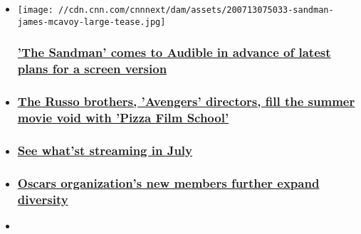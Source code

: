 \begin{itemize}
\item
  \href{/2020/07/15/entertainment/sandman-audible/index.html}{}

  \texttt{[image: //cdn.cnn.com/cnnnext/dam/assets/200713075033-sandman-james-mcavoy-large-tease.jpg]}

  \hypertarget{the-sandman-comes-to-audible-in-advance-of-latest-plans-for-a-screen-version}{%
  \subsubsection{\texorpdfstring{\href{/2020/07/15/entertainment/sandman-audible/index.html}{'The
  Sandman' comes to Audible in advance of latest plans for a screen
  version}}{'The Sandman' comes to Audible in advance of latest plans for a screen version}}\label{the-sandman-comes-to-audible-in-advance-of-latest-plans-for-a-screen-version}}
\item
  \hypertarget{the-russo-brothers-avengers-directors-fill-the-summer-movie-void-with-pizza-film-school}{%
  \subsubsection{\texorpdfstring{\href{/2020/07/09/entertainment/russo-brothers-pizza-film-school/index.html}{The
  Russo brothers, 'Avengers' directors, fill the summer movie void with
  'Pizza Film
  School'}}{The Russo brothers, 'Avengers' directors, fill the summer movie void with 'Pizza Film School'}}\label{the-russo-brothers-avengers-directors-fill-the-summer-movie-void-with-pizza-film-school}}
\item
  \hypertarget{see-whatst-streaming-in-july}{%
  \subsubsection{\texorpdfstring{\href{/2020/06/30/entertainment/netflix-hulu-amazon-july/index.html}{See
  what'st streaming in
  July}}{See what'st streaming in July}}\label{see-whatst-streaming-in-july}}
\item
  \hypertarget{oscars-organizations-new-members-further-expand-diversity}{%
  \subsubsection{\texorpdfstring{\href{/2020/07/01/entertainment/academy-new-membership-diversity-oscars/index.html}{Oscars
  organization's new members further expand
  diversity}}{Oscars organization's new members further expand diversity}}\label{oscars-organizations-new-members-further-expand-diversity}}
\item
  \hypertarget{miss-juneteenth-showcases-nicole-beharie-in-a-timeless-mother-daughter-tale}{%
}
\end{itemize}
